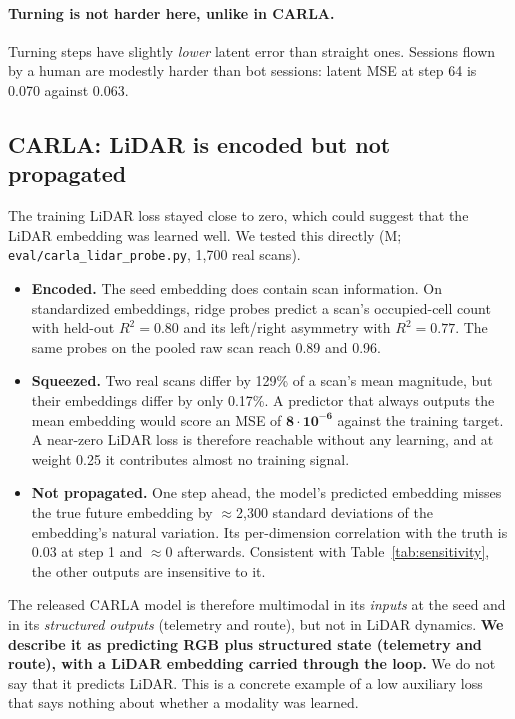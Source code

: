 \documentclass[11pt]{article}
\begin{document}
\paragraph{Turning is not harder here, unlike in CARLA.} Turning steps have slightly \emph{lower} latent error than straight ones. Sessions flown by a human are modestly harder than bot sessions: latent MSE at step 64 is 0.070 against 0.063.

\subsection{CARLA: LiDAR is encoded but not propagated}
\label{sec:lidar}

The training LiDAR loss stayed close to zero, which could suggest that the LiDAR embedding was learned well. We tested this directly (M; \texttt{eval/carla\_lidar\_probe.py}, 1,700 real scans).
\begin{itemize}
  \item \textbf{Encoded.} The seed embedding does contain scan information. On standardized embeddings, ridge probes predict a scan's occupied-cell count with held-out $R^2 = 0.80$ and its left/right asymmetry with $R^2 = 0.77$. The same probes on the pooled raw scan reach 0.89 and 0.96.
  \item \textbf{Squeezed.} Two real scans differ by 129\% of a scan's mean magnitude, but their embeddings differ by only 0.17\%. A predictor that always outputs the mean embedding would score an MSE of $\bm{8\cdot10^{-6}}$ against the training target. A near-zero LiDAR loss is therefore reachable without any learning, and at weight 0.25 it contributes almost no training signal.
  \item \textbf{Not propagated.} One step ahead, the model's predicted embedding misses the true future embedding by $\approx$2,300 standard deviations of the embedding's natural variation. Its per-dimension correlation with the truth is 0.03 at step 1 and $\approx$0 afterwards. Consistent with Table~\ref{tab:sensitivity}, the other outputs are insensitive to it.
\end{itemize}
The released CARLA model is therefore multimodal in its \emph{inputs} at the seed and in its \emph{structured outputs} (telemetry and route), but not in LiDAR dynamics. \textbf{We describe it as predicting RGB plus structured state (telemetry and route), with a LiDAR embedding carried through the loop.} We do not say that it predicts LiDAR. This is a concrete example of a low auxiliary loss that says nothing about whether a modality was learned.
\end{document}
